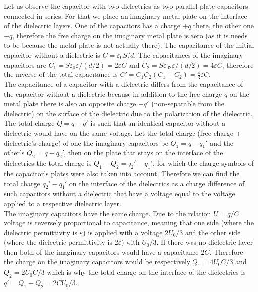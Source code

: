 \documentclass[11pt]{article}
\begin{document}
\solueng
Let us observe the capacitor with two dielectrics as two parallel plate capacitors connected in series. For that we place an imaginary metal plate on the interface of the dielectric layers. One of the capacitors has a charge $+q$ there, the other one $-q$, therefore the free charge on the imaginary metal plate is zero (as it is needs to be because the metal plate is not actually there). The capacitance of the initial capacitor without a dielectric is $C=\varepsilon_0S/d$. The capacitances of the imaginary capacitors are $C_1=S\varepsilon_0\varepsilon/(d/2)=2\varepsilon C$ and $C_2=S\varepsilon_02\varepsilon/(d/2)=4\varepsilon C$, therefore the inverse of the total capacitance is $C'=C_1C_2(C_1+C_2)=\frac 43\varepsilon C$. \\
The capacitance of a capacitor with a dielectric differs from the capacitance of the capacitor without a dielectric because in addition to the free charge $q$ on the metal plate there is also an opposite charge $-q'$ (non-separable from the dielectric) on the surface of the dielectric due to the polarization of the dielectric. The total charge $Q=q-q'$ is such that an identical capacitor without a dielectric would have on the same voltage. Let the total charge (free charge + dielectric’s charge) of one the imaginary capacitors be $Q_1=q-q_1'$ and the other’s $Q_2=q-q_2'$, then on the plate that stays on the interface of the dielectrics the total charge is $Q_1-Q_2=q_2'-q_1'$, for which the charge symbols of the capacitor’s plates were also taken into account. Therefore we can find the total charge $q_2'-q_1'$ on the interface of the dielectrics as a charge difference of such capacitors without a dielectric that have a voltage equal to the voltage applied to a respective dielectric layer.\\
The imaginary capacitors have the same charge. Due to the relation $U=q/C$ voltage is reversely proportional to capacitance, meaning that one side (where the dielectric permittivity is $\varepsilon$) is applied with a voltage $2U_0/3$ and the other side (where the dielectric permittivity is $2\varepsilon$) with $U_0/3$. If there was no dielectric layer then both of the imaginary capacitors would have a capacitance $2C$. Therefore the charge on the imaginary capacitors would be respectively $Q_1=4U_0C/3$ and $Q_2=2U_0C/3$ which is why the total charge on the interface of the dielectrics is $q'=Q_1-Q_2=2CU_0/3$.\\
\end{document}
